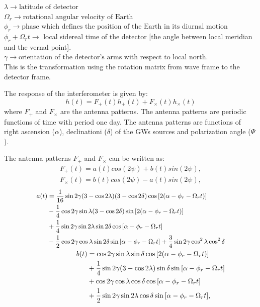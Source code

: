 \documentclass{ttuthes2007}
\begin{document}
$\lambda \rightarrow \text{latitude of detector}$\\
$\Omega_r \rightarrow \text{rotational angular velocity of Earth}$\\
$\phi_r \rightarrow \text{phase which defines the position of the Earth in its
diurnal motion}$\\
$\phi_r + \Omega_r t \rightarrow$ local sidereal time of the detector [the
angle between local meridian and the vernal point].\\
$\gamma \rightarrow \text{orientation of the detector's arms with respect to
local north.}$\\
This is the transformation using the rotation matrix from wave frame to the
detector frame. 

The response of the interferometer is given by:
\begin{equation}
h(t) = F_+(t) h_+(t) + F_\times(t) h_\times(t) 
\end{equation}
where $F_+$ and $F_\times$ are the antenna patterns. The antenna patterns are periodic
functions of time with period one day. The antenna patterns are 
functions of right ascension ($\alpha$), declinationi ($\delta$) of the \acp{GW}
sources and polarization angle ($\Psi$). 

The antenna patterns $F_+$ and $F_\times$ can be written as:
\begin{align*}
F_+(t) = a(t)cos(2\psi) + b(t) sin(2\psi),\\
F_\times(t) = b(t)cos(2\psi) - a(t) sin(2\psi),
\end{align*}
\begin{align}
\small
\begin{split}\label{eq:a}
a(t) &=
\frac{1}{16}\sin{2\gamma}(3-\cos{2\lambda})(3-\cos{2\delta})\cos{[2(\alpha-\phi_r-\Omega_rt)]}\\
&-\frac{1}{4}\cos{2\gamma} \sin{\lambda} (3-\cos{2\delta})
\sin{[2(\alpha-\phi_r-\Omega_rt)]}\\
&+\frac{1}{4}\sin{2\gamma} \sin{2\lambda} \sin{2\delta}
\cos{[\alpha-\phi_r-\Omega_r t]} \\
&-\frac{1}{2}\cos{2\gamma} \cos{\lambda} \sin{2\delta}
\sin{[\alpha-\phi_r-\Omega_r t]}
+\frac{3}{4} \sin{2\gamma} \cos^2{\lambda} \cos^2{\delta}
\end{split}\\
\begin{split}\label{eq:b}
b(t)& =\cos{2\gamma} \sin{\lambda} \sin{\delta} \cos{[2(\alpha-\phi_r-\Omega_r
t)]}\\ 
&+\frac{1}{4} \sin{2\gamma} (3-\cos{2\lambda}) \sin{\delta}
\sin{[\alpha-\phi_r-\Omega_rt]}\\
&+ \cos{2\gamma} \cos{\lambda} \cos{\delta} \cos{[\alpha-\phi_r-\Omega_r t]}\\
&+\frac{1}{2}\sin{2\gamma} \sin{2\lambda} \cos{\delta}
\sin{[\alpha-\phi_r-\Omega_rt]},
\end{split}
\end{align}
\end{document}
